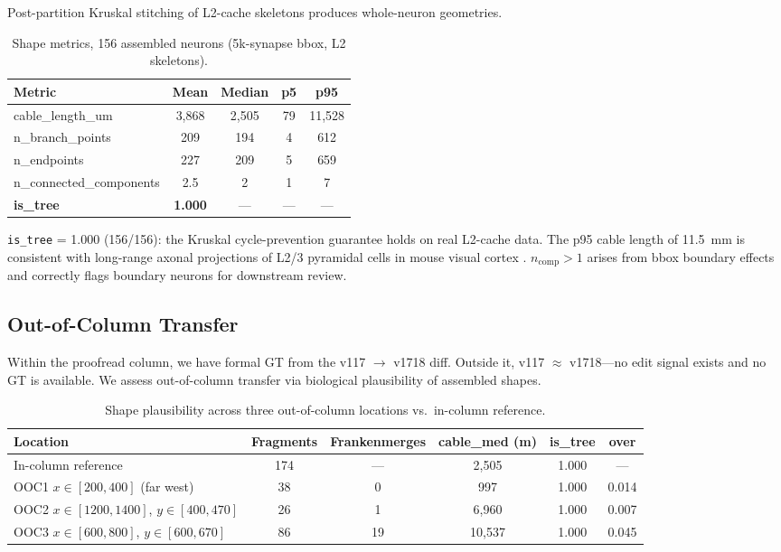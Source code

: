 \documentclass[10pt,letterpaper]{article}
\begin{document}
Post-partition Kruskal stitching of L2-cache skeletons produces whole-neuron geometries.

\begin{table}[h]
\centering
\caption{Shape metrics, 156 assembled neurons (5k-synapse bbox, L2 skeletons).}
\label{tab:shape}
\small
\begin{tabular}{lcccc}
\toprule
Metric & Mean & Median & p5 & p95 \\
\midrule
cable\_length\_um    & 3,868 & 2,505 & 79     & 11,528 \\
n\_branch\_points    &   209 &   194 &  4     &    612 \\
n\_endpoints         &   227 &   209 &  5     &    659 \\
n\_connected\_components & 2.5 & 2  &  1     &      7 \\
\textbf{is\_tree}    & \textbf{1.000} & --- & --- & --- \\
\bottomrule
\end{tabular}
\end{table}

\texttt{is\_tree} = 1.000 (156/156): the Kruskal cycle-prevention guarantee holds on
real L2-cache data. The p95 cable length of 11.5~mm is consistent with long-range axonal
projections of L2/3 pyramidal cells in mouse visual cortex \cite{marques2018}.
$n_\text{comp} > 1$ arises from bbox boundary effects and correctly flags boundary
neurons for downstream review.

\subsection{Out-of-Column Transfer}
\label{sec:ooc}

Within the proofread column, we have formal GT from the v117 $\to$ v1718 diff. Outside
it, v117 $\approx$ v1718---no edit signal exists and no GT is available. We assess
out-of-column transfer via biological plausibility of assembled shapes.

\begin{table}[h]
\centering
\caption{Shape plausibility across three out-of-column locations vs.\ in-column reference.}
\label{tab:ooc}
\small
\begin{tabular}{lccccc}
\toprule
Location & Fragments & Frankenmerges & cable\_med (\textmu{}m) & is\_tree & over \\
\midrule
In-column reference                            & 174 & ---& 2,505  & 1.000 & --- \\
OOC1 $x \in [200,400]$ (far west)             &  38 &  0 &    997 & 1.000 & 0.014 \\
OOC2 $x \in [1200,1400]$, $y \in [400,470]$   &  26 &  1 &  6,960 & 1.000 & 0.007 \\
OOC3 $x \in [600,800]$, $y \in [600,670]$     &  86 & 19 & 10,537 & 1.000 & 0.045 \\
\bottomrule
\end{tabular}
\end{table}
\end{document}
